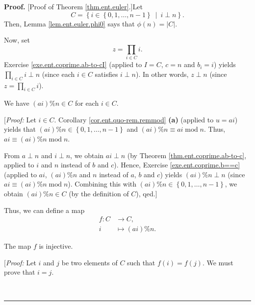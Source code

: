 \documentclass[numbers=enddot,12pt,final,onecolumn,notitlepage]{scrartcl}%
\numberwithin{exer}{subsection}
\theoremstyle{definition}
\newenvironment{proof}[1][Proof]{\noindent\textbf{#1.} }{\ \rule{0.5em}{0.5em}}
\let\prodnonlimits\prod
\renewcommand{\prod}{\prodnonlimits\limits}
\begin{document}
\begin{proof}
[Proof of Theorem \ref{thm.ent.euler}.]Let
\[
C=\left\{  i\in\left\{  0,1,\ldots,n-1\right\}  \ \mid\ i\perp n\right\}  .
\]
Then, Lemma \ref{lem.ent.euler.phi0} says that $\phi\left(  n\right)
=\left\vert C\right\vert $.

Now, set
\begin{equation}
z=\prod_{i\in C}i. \label{pf.thm.ent.euler.z=}%
\end{equation}
Exercise \ref{exe.ent.coprime.ab-to-cI} (applied to $I=C$, $c=n$ and $b_{i}%
=i$) yields $\prod_{i\in C}i\perp n$ (since each $i\in C$ satisfies $i\perp
n$). In other words, $z\perp n$ (since $z=\prod_{i\in C}i$).

We have $\left(  ai\right)  \%n\in C$ for each $i\in C$.

[\textit{Proof:} Let $i\in C$. Corollary \ref{cor.ent.quo-rem.remmod}
\textbf{(a)} (applied to $u=ai$) yields that $\left(  ai\right)
\%n\in\left\{  0,1,\ldots,n-1\right\}  $ and $\left(  ai\right)  \%n\equiv
ai\operatorname{mod}n$. Thus, $ai\equiv\left(  ai\right)
\%n\operatorname{mod}n$.

From $a\perp n$ and $i\perp n$, we obtain $ai\perp n$ (by Theorem
\ref{thm.ent.coprime.ab-to-c}, applied to $i$ and $n$ instead of $b$ and $c$).
Hence, Exercise \ref{exe.ent.coprime.b==c} (applied to $ai$, $\left(
ai\right)  \%n$ and $n$ instead of $a$, $b$ and $c$) yields $\left(
ai\right)  \%n\perp n$ (since $ai\equiv\left(  ai\right)
\%n\operatorname{mod}n$). Combining this with $\left(  ai\right)
\%n\in\left\{  0,1,\ldots,n-1\right\}  $, we obtain $\left(  ai\right)  \%n\in
C$ (by the definition of $C$), qed.]

Thus, we can define a map%
\begin{align*}
f:C  &  \rightarrow C,\\
i  &  \mapsto\left(  ai\right)  \%n.
\end{align*}


The map $f$ is injective.

[\textit{Proof:} Let $i$ and $j$ be two elements of $C$ such that $f\left(
i\right)  =f\left(  j\right)  $. We must prove that $i=j$.


\end{proof}
\end{document}
